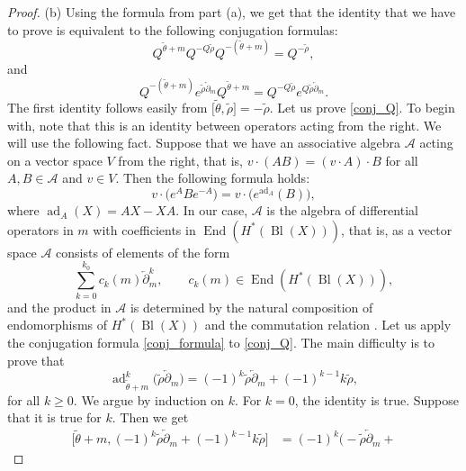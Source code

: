 \documentclass[10pt,a4paper]{article}
\numberwithin{equation}{section}
\begin{document}
\begin{proof}
(b) Using the formula from part (a), we get that the identity that we
have to prove is equivalent to the following conjugation formulas:
\[
Q^{\widetilde{\theta}+m} Q^{-Q\widetilde{\rho}}
Q^{-(\widetilde{\theta}+m)} = Q^{-\widetilde{\rho}},
\]
and
\begin{equation}\label{conj_Q}
Q^{-(\widetilde{\theta}+m)}
e^{\widetilde{\rho} \overleftarrow{\partial}_m}
Q^{\widetilde{\theta}+m} =
Q^{-Q \widetilde{\rho}}
e^{Q \widetilde{\rho} \overleftarrow{\partial}_m}.
\end{equation}
The first identity follows easily from
$\big[\widetilde{\theta},\widetilde{\rho}\big]=-\widetilde{\rho} $. Let us
prove \eqref{conj_Q}. To begin with, note that this is an
identity between operators acting from the right. We will use the
following fact. Suppose that we have an associative algebra
$\mathcal{A}$ acting on a
vector space $V$ from the right, that is, $v\cdot (AB) = (v\cdot
A)\cdot B$ for all $A,B\in \mathcal{A}$ and $v\in V$. Then the
following formula holds:
\begin{equation}\label{conj_formula}
v\cdot \big(e^A B e^{-A}\big) = v\cdot
\big(e^{\operatorname{ad}_A}(B)\big),
\end{equation}
where $\operatorname{ad}_A(X)=AX-XA$. In our case, $\mathcal{A}$ is
the algebra of differential operators in $m$ with coefficients in
$\operatorname{End}(H^*(\operatorname{Bl}(X)))$, that is, as a vector space
$\mathcal{A}$ consists of elements of the form
\[
\sum_{k=0}^{k_0} c_k(m) \overleftarrow{\partial}_m^k,\qquad
c_k(m)\in \operatorname{End}(H^*(\operatorname{Bl}(X))),
\]
and the product in $\mathcal{A}$ is determined by the natural
composition of endomorphisms of $H^*(\operatorname{Bl}(X))$ and the
commutation relation .
Let us apply the conjugation formula \eqref{conj_formula} to
\eqref{conj_Q}. The main difficulty is to prove that
\begin{equation}\label{ad^k}
\operatorname{ad}_{\widetilde{\theta}+m}^k\big(
\widetilde{\rho} \overleftarrow{\partial}_m\big) =
(-1)^{k} \widetilde{\rho} \overleftarrow{\partial}_m+
(-1)^{k-1} k \widetilde{\rho},
\end{equation}
for all $k\geq 0$. We argue by induction on $k$. For $k=0$, the
identity is true. Suppose that it is true for $k$. Then we get
\begin{align*}
\big[\widetilde{\theta}+m,
(-1)^k \widetilde{\rho} \overleftarrow{\partial}_m +
(-1)^{k-1} k \widetilde{\rho}\big] &=
(-1)^k\big(-\widetilde{\rho} \overleftarrow{\partial}_m +

\end{align*}
\end{proof}
\end{document}
